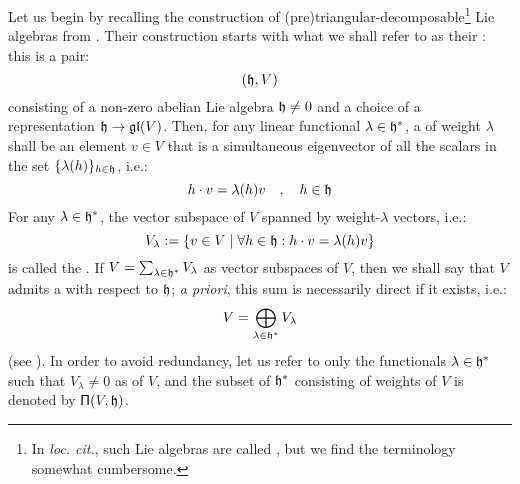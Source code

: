         Let us begin by recalling the construction of (pre)triangular-decomposable\footnote{In \textit{loc. cit.}, such Lie algebras are called , but we find the terminology somewhat cumbersome.} Lie algebras from \cite[Section 2.1]{moody_pianzola_lie_algebras_with_triangular_decompositions}. Their construction starts with what we shall refer to as their : this is a pair:
            $$(\mathfrak{h}, V)$$
        consisting of a non-zero abelian Lie algebra $\mathfrak{h} \not = 0$ and a choice of a representation $\mathfrak{h} \to \mathfrak{gl}(V)$. Then, for any linear functional $\lambda \in \mathfrak{h}^*$, a  of weight $\lambda$ shall be an element $v \in V$ that is a simultaneous eigenvector of all the scalars in the set $\{ \lambda(h) \}_{h \in \mathfrak{h}}$, i.e.:
            $$h \cdot v = \lambda(h) v \quad, \quad h \in \mathfrak{h}$$
        For any $\lambda \in \mathfrak{h}^*$, the vector subspace of $V$ spanned by weight-$\lambda$ vectors, i.e.:
            $$V_{\lambda} := \{ v \in V \mid \forall h \in \mathfrak{h}: h \cdot v = \lambda(h) v \}$$
        is called the . If $V = \sum_{\lambda \in \mathfrak{h}^*} V_{\lambda}$ as vector subspaces of $V$, then we shall say that $V$ admits a  with respect to $\mathfrak{h}$; \textit{a priori}, this sum is necessarily direct if it exists, i.e.:
            $$V = \bigoplus_{\lambda \in \mathfrak{h}^*} V_{\lambda}$$
        (see \cite[Section 2.1, Proposition 1]{moody_pianzola_lie_algebras_with_triangular_decompositions}). In order to avoid redundancy, let us refer to only the functionals $\lambda \in \mathfrak{h}^*$ such that $V_{\lambda} \not = 0$ as  of $V$, and the subset of $\mathfrak{h}^*$ consisting of weights of $V$ is denoted by $\mathsf{\Pi}(V, \mathfrak{h})$.

